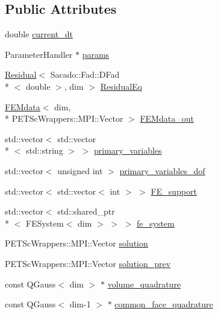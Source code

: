\subsection*{Public Attributes}
\begin{DoxyCompactItemize}
\item 
double \hyperlink{classinit_bound_val_probs_a68c7b36b181a92a91945137308e74a6d}{current\-\_\-dt}
\item 
Parameter\-Handler $\ast$ \hyperlink{classinit_bound_val_probs_a31d5e7a5228d9d55ba00fae854fcfaa0}{params}
\item 
\hyperlink{class_residual}{Residual}$<$ Sacado\-::\-Fad\-::\-D\-Fad\\*
$<$ double $>$, dim $>$ \hyperlink{classinit_bound_val_probs_adeaa7307c79088ccde0e35feb27eb0b0}{Residual\-Eq}
\item 
\hyperlink{class_f_e_mdata}{F\-E\-Mdata}$<$ dim, \\*
P\-E\-T\-Sc\-Wrappers\-::\-M\-P\-I\-::\-Vector $>$ \hyperlink{classinit_bound_val_probs_af7b22336bf40c3a2865dff2cb708136d}{F\-E\-Mdata\-\_\-out}
\item 
std\-::vector$<$ std\-::vector\\*
$<$ std\-::string $>$ $>$ \hyperlink{classinit_bound_val_probs_a4933860ad833b7b9bd2b8effee5c36d6}{primary\-\_\-variables}
\item 
std\-::vector$<$ unsigned int $>$ \hyperlink{classinit_bound_val_probs_a20e37946082ad677ffab164a6dead8b3}{primary\-\_\-variables\-\_\-dof}
\item 
std\-::vector$<$ std\-::vector$<$ int $>$ $>$ \hyperlink{classinit_bound_val_probs_ab0e06106bfe2ab795399d91169290e8a}{F\-E\-\_\-support}
\item 
std\-::vector$<$ std\-::shared\-\_\-ptr\\*
$<$ F\-E\-System$<$ dim $>$ $>$ $>$ \hyperlink{classinit_bound_val_probs_abeb9cdd6078108148320406c68bfa0d1}{fe\-\_\-system}
\item 
P\-E\-T\-Sc\-Wrappers\-::\-M\-P\-I\-::\-Vector \hyperlink{classinit_bound_val_probs_ae539da5c193ce7d8d07f654067f111ca}{solution}
\item 
P\-E\-T\-Sc\-Wrappers\-::\-M\-P\-I\-::\-Vector \hyperlink{classinit_bound_val_probs_ab5b94542feace0c45c2c69696ce9a266}{solution\-\_\-prev}
\item 
const Q\-Gauss$<$ dim $>$ $\ast$ \hyperlink{classinit_bound_val_probs_a7e2363a91f6f1626f463f3a06108c03b}{volume\-\_\-quadrature}
\item 
const Q\-Gauss$<$ dim-\/1 $>$ $\ast$ \hyperlink{classinit_bound_val_probs_af302403bba9078de92d05b4cbe6f44dd}{common\-\_\-face\-\_\-quadrature}

\end{DoxyCompactItemize}

